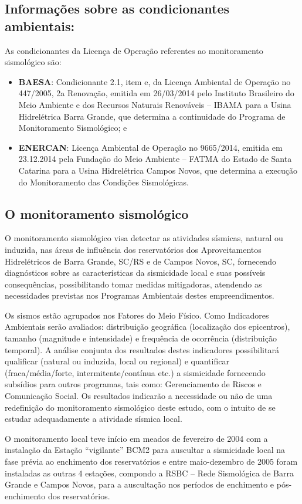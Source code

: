\clearpage

\subsection{Informações sobre as condicionantes ambientais:}
As condicionantes da Licença de Operação referentes ao monitoramento sismológico são:
\begin{itemize}
    \item \textbf{BAESA}: Condicionante 2.1, item e, da Licença Ambiental de Operação no 447/2005, 2a Renovação, emitida em 26/03/2014 pelo Instituto Brasileiro do Meio Ambiente e dos Recursos Naturais Renováveis – IBAMA para a Usina Hidrelétrica Barra Grande, que determina a continuidade do Programa de Monitoramento Sismológico; e
    \item \textbf{ENERCAN}: Licença Ambiental de Operação no 9665/2014, emitida em 23.12.2014 pela Fundação do Meio Ambiente – FATMA do Estado de Santa Catarina para a Usina Hidrelétrica Campos Novos, que determina a execução do Monitoramento das Condições Sismológicas.
\end{itemize}

\subsection{O monitoramento sismológico}
\par{O monitoramento sismológico visa detectar as atividades sísmicas, natural ou induzida, nas áreas de influência dos reservatórios dos Aproveitamentos Hidrelétricos de Barra Grande, SC/RS e de Campos Novos, SC, fornecendo diagnósticos sobre as características da sismicidade local e suas possíveis consequências, possibilitando tomar medidas mitigadoras, atendendo as necessidades previstas nos Programas Ambientais destes empreendimentos.}\\
\par{Os sismos estão agrupados nos Fatores do Meio Físico. Como Indicadores Ambientais serão avaliados: distribuição geográfica (localização dos epicentros), tamanho (magnitude e intensidade) e frequência de ocorrência (distribuição temporal). A análise conjunta dos resultados destes indicadores possibilitará qualificar (natural ou induzida, local ou regional) e quantificar (fraca/média/forte, intermitente/contínua etc.) a sismicidade fornecendo subsídios para outros programas, tais como: Gerenciamento de Riscos e Comunicação Social. Os resultados indicarão a necessidade ou não de uma redefinição do monitoramento sismológico deste estudo, com o intuito de se estudar adequadamente a atividade sísmica local.}\\
\par{O monitoramento local teve início em meados de fevereiro de 2004 com a instalação da Estação “vigilante” BCM2 para auscultar a sismicidade local na fase  prévia ao enchimento dos reservatórios e entre maio-dezembro de 2005 foram instaladas as outras 4 estações, compondo a RSBC – Rede Sismológica de Barra Grande e Campos Novos, para a auscultação nos períodos de enchimento e pós-enchimento dos reservatórios.}\\

